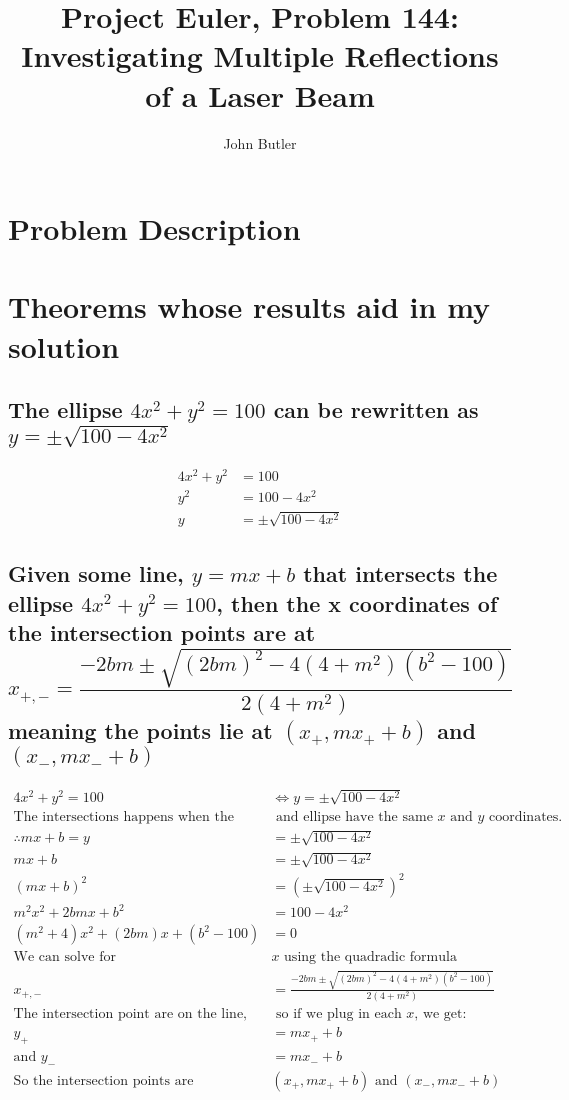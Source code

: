 \documentclass[11pt, oneside]{article}   	%
\title{Project Euler, Problem 144:\\\large{Investigating Multiple Reflections of a Laser Beam}}
\author{John Butler}
\date{}							%
\begin{document}
\maketitle

\tableofcontents
\newpage

\section{Problem Description}
	
\section{Theorems whose results aid in my solution}

\subsection{The ellipse $4x^2 + y^2 = 100$ can be rewritten as $y = \pm \sqrt{100 - 4x^2}$}
	\begin{align*}
		4x^2 + y^2 &= 100\\
		y^2 &= 100 - 4x^2\\
		y &= \pm \sqrt{100 - 4x^2}
	\end{align*}

\subsection{Given some line, $y=mx+b$ that intersects the ellipse $4x^2+y^2=100$, then the x coordinates of the 
intersection points are at $$x_{+,-} = \frac{-2bm \pm \sqrt{(2bm)^2 - 4(4+m^2)(b^2 - 100)}}{2(4 + m^2)}$$ 
meaning the points lie at $(x_+,mx_++b)$ and $(x_-, mx_- + b)$}
	\begin{align*}
		4x^2 + y^2 = 100 &\iff y = \pm \sqrt{100-4x^2 }\\
		\text{The intersections happens when the line}&\text{ and ellipse have the same $x$ and $y$ coordinates.}\\
		\therefore mx+b = y &= \pm \sqrt{100 - 4x^2}\\
		mx+b  &= \pm \sqrt{100 - 4x^2}\\
		(mx+b)^2 &= (\pm\sqrt{100 - 4x^2})^2\\
		m^2x^2 + 2bmx + b^2 &= 100 - 4x^2\\
		(m^2 + 4)x^2 + (2bm)x + (b^2 - 100) &= 0\\
		\text{We can solve for }&x\text{ using the quadradic formula}\\
		x_{+,-} &= \frac{-2bm \pm \sqrt{(2bm)^2 - 4(4+m^2)(b^2 - 100)}}{2(4 + m^2)}\\
		\text{The intersection point are on the line,}&\text{ so if we plug in each $x$, we get:}\\
		y_+ &= mx_++b\\
		\text{and }y_- &= mx_- + b\\
		\text{So the intersection points are }&(x_+,mx_++b) \text{ and }(x_-, mx_- + b)
	\end{align*}
\end{document}
